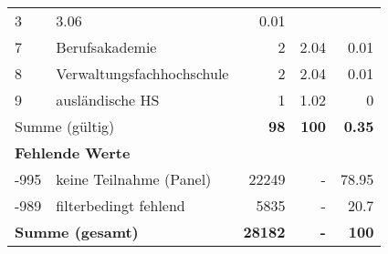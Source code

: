 \begin{longtable}{lXrrr}
       \num{3} &
       \num[round-mode=places,round-precision=2]{3,06} &
         \num[round-mode=places,round-precision=2]{0,01} \\

     7 &
     \multicolumn{1}{X}{ Berufsakademie   } &


       \num{2} &
       \num[round-mode=places,round-precision=2]{2,04} &
         \num[round-mode=places,round-precision=2]{0,01} \\

     8 &
     \multicolumn{1}{X}{ Verwaltungsfachhochschule   } &


       \num{2} &
       \num[round-mode=places,round-precision=2]{2,04} &
         \num[round-mode=places,round-precision=2]{0,01} \\

     9 &
     \multicolumn{1}{X}{ ausländische HS   } &


       \num{1} &
       \num[round-mode=places,round-precision=2]{1,02} &
         \num[round-mode=places,round-precision=2]{0} \\
     \midrule
     \multicolumn{2}{l}{Summe (gültig)} &
       \textbf{\num{98}} &
     \textbf{100} &
       \textbf{\num[round-mode=places,round-precision=2]{0,35}} \\
     \multicolumn{5}{l}{\textbf{Fehlende Werte}}\\
       -995 &
       keine Teilnahme (Panel) &
         \num{22249} &
        - &
         \num[round-mode=places,round-precision=2]{78,95} \\
       -989 &
       filterbedingt fehlend &
         \num{5835} &
        - &
         \num[round-mode=places,round-precision=2]{20,7} \\
     \midrule
     \multicolumn{2}{l}{\textbf{Summe (gesamt)}} &
          \textbf{\num{28182}} &
        \textbf{-} &
        \textbf{100} \\
     \bottomrule
     \end{longtable}
     
